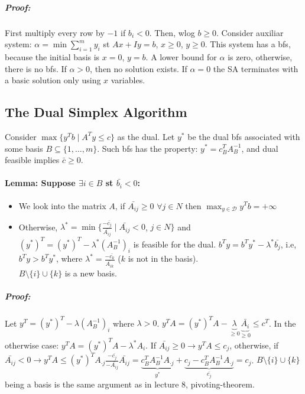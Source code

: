 \documentclass[main]{subfiles}
\begin{document}
\subparagraph{Proof:}
First multiply every row by $-1$ if $b_i < 0$. Then, wlog $b \geq 0$.
Consider auxiliar system: $\alpha = \min \sum_{i=1}^{m} y_i$ st $ Ax + Iy = b$,
$x \geq 0$, $y \geq 0$. This system has a bfs, because the initial basis is
$x = 0$, $y = b$. A lower bound for $\alpha$ is zero, otherwise, there is no
bfs. If $\alpha > 0$, then no solution exists. If $\alpha = 0$ the SA
terminates with a basic solution only using $x$ variables.

\subsection{The Dual Simplex Algorithm}

Consider $\max \{y^T b \mid A^T y \leq c \}$ as the dual. Let $y^*$ be the dual
bfs associated with some basis $B \subseteq \{1, \dots, m\}$. Such bfs has the
property: $y^* = c^T_B A^{-1}_B$, and dual feasible implies $\bar{c} \geq 0$.

\paragraph{Lemma: Suppose $\exists i \in B$ st $\bar{b_i} < 0$:}
\begin{itemize}
\item We look into the matrix $A$, if $\bar{A_{ij}} \geq 0$ $\forall j \in N$
then $\displaystyle \max_{y \in \mathcal{D}} y^{T} b = + \infty$
\item Otherwise, $\lambda^* = \min \{\frac{-\bar{c_j}}{\bar{A_{ij}}} \mid
\bar{A_{ij}} < 0$, $j \in N \}$ and $(y^*)^T = (y^*)^T - \lambda^*
(A^{-1}_B)_i$ is feasible for the dual. $b^T y = b^T y^* - \lambda^*
\bar{b_j}$, i.e, $b^T y > b^T y^*$, where $\lambda^* = \frac{-\bar{c_k}}
{\bar{A_{ik}}}$ ($k$ is not in the basis).\\
$B \setminus \{i\} \cup \{k\}$ is a new basis.
\end{itemize}

\subparagraph{Proof:}
Let $y^T = (y^*)^T - \lambda (A^{-1}_B)_i$ where $\lambda > 0$.
$y^T A = (y^*)^T  A - \underbrace{\lambda}_{\geq 0}
\underbrace{\bar{A_i}}_{\geq 0} \leq c^T$.
In the otherwise case: $y^T A = (y^*)^T  A - \lambda^* A_i$. If $\bar{A_{ij}}
\geq 0 \rightarrow y^T A \leq c_j$, otherwise, if $\bar{A_{ij}} < 0 \rightarrow
y^T A \leq (y^*)^T A_{\cdot j} \frac{-\bar{c_j}}{-\bar{A_{ij}}} \bar{A_{ij}} =
\underbrace{c^T_B A^{-1}_B A_{\cdot j}}_{y^*} +
\underbrace{c_j - c^T_B A^{-1}_B A_{\cdot j}}_{\bar{c_j}} = c_j$.
$B\setminus \{i\} \cup \{k\}$ being a basis is the same argument as in lecture
8, pivoting-theorem.
\end{document}

